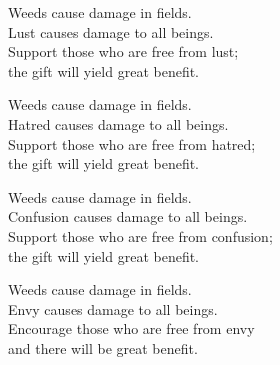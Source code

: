 Weeds cause damage in fields.\\
Lust causes damage to all beings.\\
Support those who are free from lust;\\
the gift will yield great benefit.


Weeds cause damage in fields.\\
Hatred causes damage to all beings.\\
Support those who are free from hatred;\\
the gift will yield great benefit.


Weeds cause damage in fields.\\
Confusion causes damage to all beings.\\
Support those who are free from confusion;\\
the gift will yield great benefit.


Weeds cause damage in fields.\\
Envy causes damage to all beings.\\
Encourage those who are free from envy\\
and there will be great benefit.

